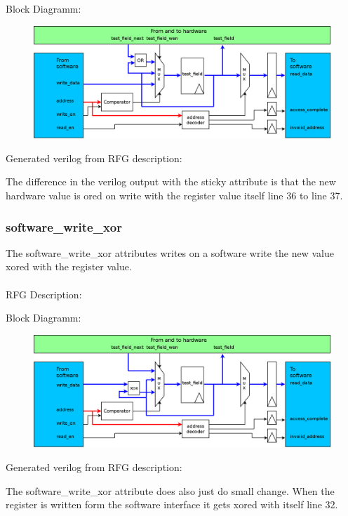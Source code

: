 \documentclass[12pt,a4paper]{article}
\begin{document}
Block Diagramm:
\begin{figure}[h!]
    \includegraphics[width=\textwidth]{pictures/Reg_hrw_srw_sticky.png}
\end{figure}
\newpage
Generated verilog from RFG description:

The difference in the verilog output with the sticky attribute is that the new hardware value is ored on write with the register value itself line 36 to line 37.
\newpage

\subsubsection{software\_write\_xor}
The software\_write\_xor attributes writes on a software write the new value xored with the register value.\\
\\
RFG Description:


Block Diagramm:
\begin{figure}[h!]
    \includegraphics[width=\textwidth]{pictures/Reg_hrw_srw_swrite_xor.png}
\end{figure}
\newpage
Generated verilog from RFG description:

The software\_write\_xor attribute does also just do small change. When the register is written form the software interface it gets xored with itself line 32.
\newpage
\end{document}
